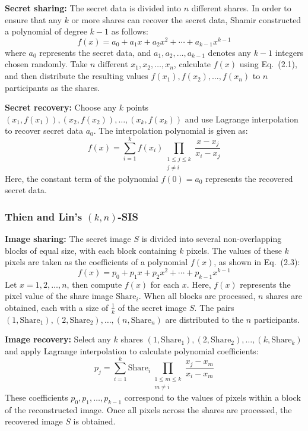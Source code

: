 \textbf{Secret sharing:} The secret data is divided into $n$ different shares. In order to ensure that any $k$ or more shares can recover the secret data, Shamir constructed a polynomial of degree $k - 1$ as follows:
\begin{equation}
    f(x) = a_0 + a_1 x + a_2 x^2 + \cdots + a_{k-1} x^{k-1}
\end{equation}
where $a_0$ represents the secret data, and $a_1, a_2, \ldots, a_{k-1}$ denotes any $k - 1$ integers chosen randomly. Take $n$ different $x_1, x_2, \ldots, x_n$, calculate $f(x)$ using Eq.~(2.1), and then distribute the resulting values $f(x_1), f(x_2), \ldots, f(x_n)$ to $n$ participants as the shares.
 
\textbf{Secret recovery:} Choose any $k$ points $(x_1, f(x_1)), (x_2, f(x_2)), \ldots, (x_k, f(x_k))$ and use Lagrange interpolation to recover secret data $a_0$. The interpolation polynomial is given as:
\begin{equation}
    f(x) = \sum_{i=1}^{k} f(x_i) \prod_{\substack{1 \leq j \leq k \\ j \neq i}} \frac{x - x_j}{x_i - x_j}
\end{equation}
Here, the constant term of the polynomial $f(0) = a_0$ represents the recovered secret data.
 
\subsubsection{Thien and Lin's $(k, n)$-SIS}
 
\textbf{Image sharing:} The secret image $S$ is divided into several non-overlapping blocks of equal size, with each block containing $k$ pixels. The values of these $k$ pixels are taken as the coefficients of a polynomial $f(x)$, as shown in Eq.~(2.3):
\begin{equation}
    f(x) = p_0 + p_1 x + p_2 x^2 + \cdots + p_{k-1} x^{k-1}
\end{equation}
Let $x = 1, 2, \ldots, n$, then compute $f(x)$ for each $x$. Here, $f(x)$ represents the pixel value of the share image $\mathrm{Share}_i$. When all blocks are processed, $n$ shares are obtained, each with a size of $\frac{1}{k}$ of the secret image $S$. The pairs $(1, \mathrm{Share}_1), (2, \mathrm{Share}_2), \ldots, (n, \mathrm{Share}_n)$ are distributed to the $n$ participants.
 
\textbf{Image recovery:} Select any $k$ shares $(1, \mathrm{Share}_1), (2, \mathrm{Share}_2), \ldots, (k, \mathrm{Share}_k)$ and apply Lagrange interpolation to calculate polynomial coefficients:
\begin{equation}
    p_j = \sum_{i=1}^{k} \mathrm{Share}_i \prod_{\substack{1 \leq m \leq k \\ m \neq i}} \frac{x_j - x_m}{x_i - x_m}
\end{equation}
These coefficients $p_0, p_1, \ldots, p_{k-1}$ correspond to the values of pixels within a block of the reconstructed image. Once all pixels across the shares are processed, the recovered image $S$ is obtained.
 
